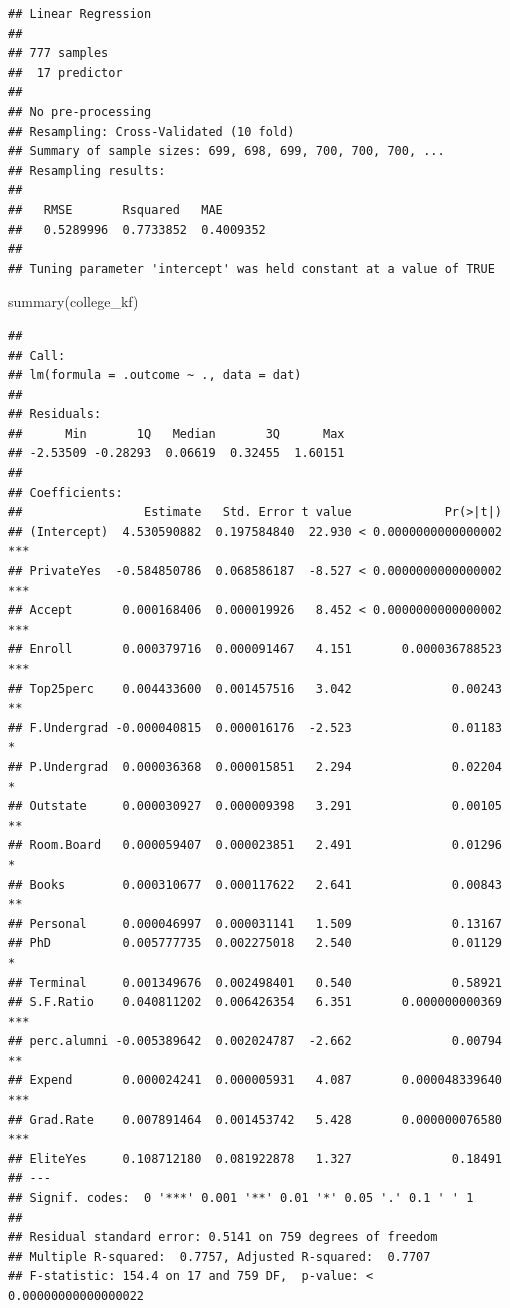 \documentclass[]{article}
\newenvironment{Shaded}{\begin{snugshade}}{\end{snugshade}}
\newcommand{\FunctionTok}[1]{\textcolor[rgb]{0.00,0.00,0.00}{#1}}
\newcommand{\NormalTok}[1]{#1}
\begin{document}
\begin{verbatim}
## Linear Regression 
## 
## 777 samples
##  17 predictor
## 
## No pre-processing
## Resampling: Cross-Validated (10 fold) 
## Summary of sample sizes: 699, 698, 699, 700, 700, 700, ... 
## Resampling results:
## 
##   RMSE       Rsquared   MAE      
##   0.5289996  0.7733852  0.4009352
## 
## Tuning parameter 'intercept' was held constant at a value of TRUE
\end{verbatim}

\begin{Shaded}
\begin{Highlighting}[]
\FunctionTok{summary}\NormalTok{(college\_kf)}
\end{Highlighting}
\end{Shaded}

\begin{verbatim}
## 
## Call:
## lm(formula = .outcome ~ ., data = dat)
## 
## Residuals:
##      Min       1Q   Median       3Q      Max 
## -2.53509 -0.28293  0.06619  0.32455  1.60151 
## 
## Coefficients:
##                 Estimate   Std. Error t value             Pr(>|t|)    
## (Intercept)  4.530590882  0.197584840  22.930 < 0.0000000000000002 ***
## PrivateYes  -0.584850786  0.068586187  -8.527 < 0.0000000000000002 ***
## Accept       0.000168406  0.000019926   8.452 < 0.0000000000000002 ***
## Enroll       0.000379716  0.000091467   4.151       0.000036788523 ***
## Top25perc    0.004433600  0.001457516   3.042              0.00243 ** 
## F.Undergrad -0.000040815  0.000016176  -2.523              0.01183 *  
## P.Undergrad  0.000036368  0.000015851   2.294              0.02204 *  
## Outstate     0.000030927  0.000009398   3.291              0.00105 ** 
## Room.Board   0.000059407  0.000023851   2.491              0.01296 *  
## Books        0.000310677  0.000117622   2.641              0.00843 ** 
## Personal     0.000046997  0.000031141   1.509              0.13167    
## PhD          0.005777735  0.002275018   2.540              0.01129 *  
## Terminal     0.001349676  0.002498401   0.540              0.58921    
## S.F.Ratio    0.040811202  0.006426354   6.351       0.000000000369 ***
## perc.alumni -0.005389642  0.002024787  -2.662              0.00794 ** 
## Expend       0.000024241  0.000005931   4.087       0.000048339640 ***
## Grad.Rate    0.007891464  0.001453742   5.428       0.000000076580 ***
## EliteYes     0.108712180  0.081922878   1.327              0.18491    
## ---
## Signif. codes:  0 '***' 0.001 '**' 0.01 '*' 0.05 '.' 0.1 ' ' 1
## 
## Residual standard error: 0.5141 on 759 degrees of freedom
## Multiple R-squared:  0.7757, Adjusted R-squared:  0.7707 
## F-statistic: 154.4 on 17 and 759 DF,  p-value: < 0.00000000000000022
\end{verbatim}
\end{document}
